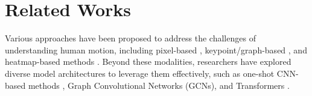 \section{Related Works}
\label{sec:related_works}




Various approaches have been proposed to address the challenges of understanding human motion, including pixel-based \cite{bertasius2021space, wang2023memory, chen2024internvl}, keypoint/graph-based \cite{yan2018spatial, shi2019two, yang2021unik}, and heatmap-based methods \cite{PoseConv3D, feng2023diffpose}. Beyond these modalities, researchers have explored diverse model architectures to leverage them effectively, such as one-shot CNN-based methods \cite{Zhou2017, Pavlakos2018, sarandi2021metrabs}, Graph Convolutional Networks (GCNs), and Transformers \cite{LinWang2021, PoseFormer, Xu2021, Wehrbein2021, PoseSeq2Seq, 10030830}.

